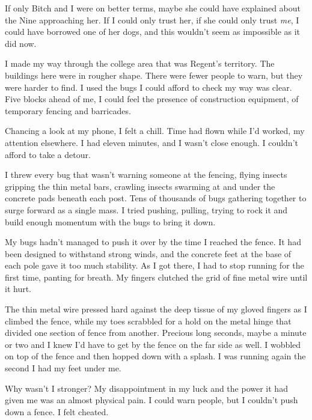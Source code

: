 If only Bitch and I were on better terms, maybe she could have explained about the Nine approaching her.  If I could only trust her, if she could only trust \emph{me}, I could have borrowed one of her dogs, and this wouldn't seem as impossible as it did now.



I made my way through the college area that was Regent's territory.  The buildings here were in rougher shape.  There were fewer people to warn, but they were harder to find.  I used the bugs I could afford to check my way was clear.  Five blocks ahead of me, I could feel the presence of construction equipment, of temporary fencing and barricades.



Chancing a look at my phone, I felt a chill.  Time had flown while I'd worked, my attention elsewhere.  I had eleven minutes, and I wasn't close enough.  I couldn't afford to take a detour.



I threw every bug that wasn't warning someone at the fencing, flying insects gripping the thin metal bars, crawling insects swarming at and under the concrete pads beneath each post.  Tens of thousands of bugs gathering together to surge forward as a single mass.  I tried pushing, pulling, trying to rock it and build enough momentum with the bugs to bring it down.



My bugs hadn't managed to push it over by the time I reached the fence.  It had been designed to withstand strong winds, and the concrete feet at the base of each pole gave it too much stability.  As I got there, I had to stop running for the first time, panting for breath.  My fingers clutched the grid of fine metal wire until it hurt.



The thin metal wire pressed hard against the deep tissue of my gloved fingers as I climbed the fence, while my toes scrabbled for a hold on the metal hinge that divided one section of fence from another.  Precious long seconds, maybe a minute or two and I knew I'd have to get by the fence on the far side as well.  I wobbled on top of the fence and then hopped down with a splash.  I was running again the second I had my feet under me.



Why wasn't I stronger?  My disappointment in my luck and the power it had given me was an almost physical pain.  I could warn people, but I couldn't push down a fence.  I felt cheated.



